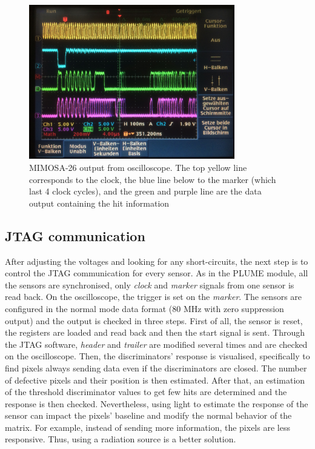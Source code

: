   \begin{figure}[h]
    \centering
    \includegraphics[width=0.8\textwidth]{Pictures/labTests/mi26_output}
    \caption{MIMOSA-26 output from oscilloscope. The top yellow line corresponds to the clock, the blue line below to the marker (which last 4 clock cycles), and the green and purple line are the data output containing the hit information}
    \label{fig:mi26Output}
  \end{figure}

  \subsection{JTAG communication}

  After adjusting the voltages and looking for any short-circuits, the next step is to control the \gls{JTAG} communication for every sensor.
  As in the \gls{PLUME} module, all the sensors are synchronised, only \textit{clock} and \textit{marker} signals from one sensor is read back.
  On the oscilloscope, the trigger is set on the \textit{marker}.  
  The sensors are configured in the normal mode data format (80 MHz with zero suppression output) and the output is checked in three steps.
  First of all, the sensor is reset, the registers are loaded and read back and then the start signal is sent. 
  Through the \gls{JTAG} software, \textit{header} and \textit{trailer} are modified several times and are checked on the oscilloscope.
  Then, the discriminators' response is visualised, specifically to find pixels always sending data even if the discriminators are closed.
  The number of defective pixels and their position is then estimated.
  After that, an estimation of the threshold discriminator values to get few hits are determined and the response is then checked.
  Nevertheless, using light to estimate the response of the sensor can impact the pixels' baseline and modify the normal behavior of the matrix.
  For example, instead of sending more information, the pixels are less responsive.
  Thus, using a radiation source is a better solution.

